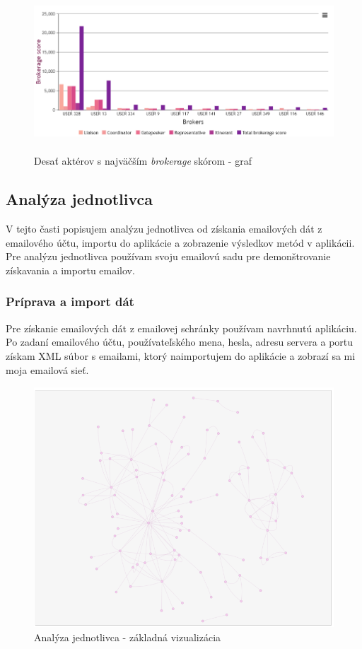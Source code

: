 \documentclass[slovak,master,public,dept460,male,cpdeclaration,oneside]{diploma}
\begin{document}
\begin{figure}[H]
\centering
\includegraphics[width=15cm, height=6cm]{figures/team_brokerage_graph}
\caption{Desať aktérov s najväčším \textit{brokerage} skórom - graf}
\label{team_brokerage_graph}
\end{figure}

\subsection{Analýza jednotlivca}
V tejto časti popisujem analýzu jednotlivca od získania emailových dát z emailového účtu, importu do aplikácie a zobrazenie výsledkov metód v aplikácii. Pre analýzu jednotlivca používam svoju emailovú sadu pre demonštrovanie získavania a importu emailov.

\subsubsection{Príprava a import dát}
Pre získanie emailových dát z emailovej schránky používam navrhnutú aplikáciu. Po zadaní emailového účtu, používateľského mena, hesla, adresu servera a portu získam XML súbor s emailami, ktorý naimportujem do aplikácie a zobrazí sa mi moja emailová sieť.


\begin{figure}[H]
\centering
\includegraphics[width=13cm, height=9cm]{figures/analyza_jednotlivca_net}
\caption{Analýza jednotlivca - základná vizualizácia}
\label{team_brokerage_graph}
\end{figure}
\end{document}
